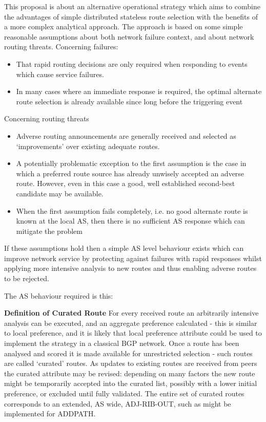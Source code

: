 This proposal is about an alternative operational strategy which aims to combine the advantages of simple distributed stateless route selection with the benefits of a more complex analytical approach. The approach is based on some simple reasonable assumptions about both network failure context, and about network routing threats. Concerning failures:

\begin{itemize}
	\item That rapid routing decisions are only required when responding to events which cause service failures.
	\item In many cases where an immediate response is required, the optimal alternate route selection is already available since long before the triggering event
\end{itemize}
Concerning routing threats

\begin{itemize}
	\item Adverse routing announcements are generally received and selected as ‘improvements’ over existing adequate routes.
	\item A potentially problematic exception to the first assumption is the case in which a preferred route source has already unwisely accepted an adverse route. However, even in this case a good, well established second-best candidate may be available.
	\item When the first assumption fails completely, i.e. no good alternate route is known at the local AS, then there is no sufficient AS response which can mitigate the problem
\end{itemize}
If these assumptions hold then a simple AS level behaviour exists which can improve network service by protecting against failures with rapid responses whilst applying more intensive analysis to new routes and thus enabling adverse routes to be rejected.

The AS behaviour required is this:

\textbf{Definition of Curated Route} For every received route an arbitrarily intensive analysis can be executed, and an aggregate preference calculated - this is similar to local preference, and it is likely that local preference attribute could be used to implement the strategy in a classical BGP network. Once a route has been analysed and scored it is made available for unrestricted selection - such routes are called ‘curated’ routes. As updates to existing routes are received from peers the curated attribute may be revised: depending on many factors the new route might be temporarily accepted into the curated list, possibly with a lower initial preference, or excluded until fully validated. The entire set of curated routes corresponds to an extended, AS wide, ADJ-RIB-OUT, such as might be implemented for ADDPATH.

